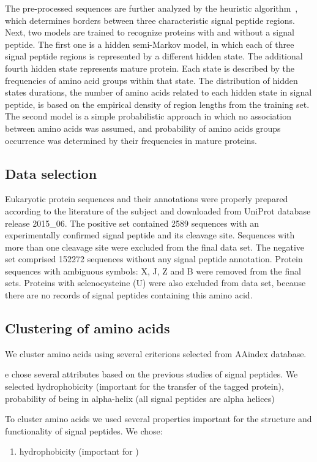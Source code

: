 \documentclass[fleqn,10pt,twoside]{gcb15submission}
\begin{document}
The pre-processed sequences are further analyzed by the heuristic algorithm~\citep{1998nielsenprediction}, which determines borders between three characteristic signal peptide regions. Next, two models are trained to recognize proteins with and without a signal peptide. The first one is a hidden semi-Markov model, in which each of three signal peptide regions is represented by a different hidden state. The additional fourth hidden state represents mature protein. Each state is described by the frequencies of amino acid groups  within that state. The distribution of hidden states durations, the number of amino acids related to each hidden state in signal peptide, is based on the empirical density of region lengths from the training set. The second model is a simple probabilistic approach in which no association between amino acids was assumed, and probability of amino acids groups occurrence was determined by their frequencies in mature proteins.

\subsection*{Data selection}

Eukaryotic protein sequences and their annotations were properly prepared according to the literature of the subject and downloaded from UniProt database release 2015\_06. The positive set contained 2589 sequences with an experimentally confirmed signal peptide and its cleavage site. Sequences with more than one cleavage site were excluded from the final data set. The negative set comprised 152272 sequences without any signal peptide annotation. Protein sequences with ambiguous symbols: X, J, Z and B were removed from the final sets. Proteins with selenocysteine (U) were also excluded from data set, because there are no records of signal peptides containing this amino acid.

\subsection*{Clustering of amino acids}

We cluster amino acids using several criterions selected from AAindex database.

e chose several attributes based on the previous studies of signal peptides. We selected hydrophobicity (important for the transfer of the tagged protein), probability of being in alpha-helix (all signal peptides are alpha helices)

To cluster amino acids we used several properties important for the structure and functionality of signal peptides. We chose:
\begin{enumerate}[noitemsep] 
\item hydrophobicity (important for )
\end{enumerate}
\end{document}
